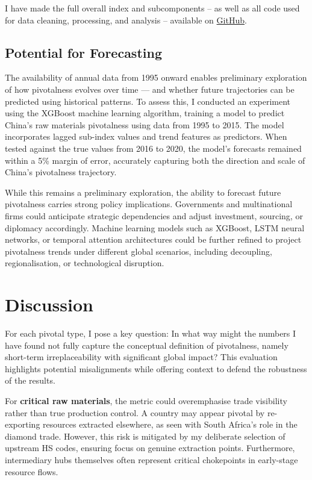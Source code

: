 \documentclass[11pt]{article}
\begin{document}
I have made the full overall index and subcomponents -- as well as all code used for data cleaning, processing, and analysis -- available on \href{https://github.com/Wendyyu-08/EPQ}{GitHub}.

\subsection{Potential for Forecasting}

The availability of annual data from 1995 onward enables preliminary exploration of how pivotalness evolves over time — and whether future trajectories can be predicted using historical patterns. To assess this, I conducted an experiment using the XGBoost machine learning algorithm, training a model to predict China’s raw materials pivotalness using data from 1995 to 2015. The model incorporates lagged sub-index values and trend features as predictors. When tested against the true values from 2016 to 2020, the model’s forecasts remained within a 5\% margin of error, accurately capturing both the direction and scale of China's pivotalness trajectory.

While this remains a preliminary exploration, the ability to forecast future pivotalness carries strong policy implications. Governments and multinational firms could anticipate strategic dependencies and adjust investment, sourcing, or diplomacy accordingly. Machine learning models such as XGBoost, LSTM neural networks, or temporal attention architectures could be further refined to project pivotalness trends under different global scenarios, including decoupling, regionalisation, or technological disruption.


\section{Discussion} 
\label{sec:evaluation}

For each pivotal type, I pose a key question: In what way might the numbers I have found not fully capture the conceptual definition of pivotalness, namely short-term irreplaceability with significant global impact? This evaluation highlights potential misalignments while offering context to defend the robustness of the results.

For \textbf{critical raw materials}, the metric could overemphasise trade visibility rather than true production control. A country may appear pivotal by re-exporting resources extracted elsewhere, as seen with South Africa’s role in the diamond trade. However, this risk is mitigated by my deliberate selection of upstream HS codes, ensuring focus on genuine extraction points. Furthermore, intermediary hubs themselves often represent critical chokepoints in early-stage resource flows.
\end{document}
